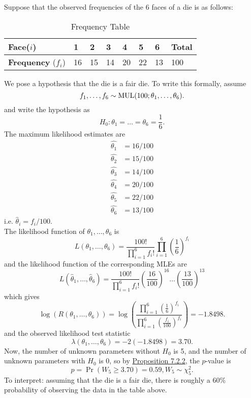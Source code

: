 \documentclass[11pt,fleqn]{book} %
\begin{document}
\begin{example} \label{eg:725}
Suppose that the observed frequencies of the 6 faces of a die is as follows:
\begin{table}[h]
\centering
\begin{tabular}{l l l l l l l l}
\toprule
\textbf{Face}(\(i\)) & 1 & 2 & 3 & 4 & 5 & 6 & \textbf{Total} \\
\midrule
\textbf{Frequency} (\(f_i\)) & 16 & 15 & 14 & 20 & 22 & 13 & 100 \\
\bottomrule
\end{tabular}
\caption{Frequency Table}
\end{table}
\indent We pose a hypothesis that the die is a fair die. To write this formally, assume
\[
f_1, \ldots, f_6 \sim \operatorname{MUL}(100; \theta_1, \ldots, \theta_6).
\]
and write the hypothesis as
\[
H_0: \theta_1 = \dots = \theta_6 = \frac16.
\]
\indent The maximum likelihood estimates are
\[
\begin{aligned}
\hat{\theta_1} &= 16/100 \\
\hat{\theta_2} &= 15/100 \\
\hat{\theta_3} &= 14/100 \\
\hat{\theta_4} &= 20/100 \\
\hat{\theta_5} &= 22/100 \\
\hat{\theta_6} &= 13/100
\end{aligned}
\]
i.e. \(\hat{\theta}_i = f_i / 100\). \\
\indent The likelihood function of \(\theta_1, \ldots, \theta_6\) is
\[
L(\theta_1, \ldots, \theta_6) = \frac{100!}{\prod_{i=1}^6 f_i!} \prod_{i=1}^6\left(\frac16\right)^{f_i}
\]
and the likelihood function of the corresponding MLEs are
\[
L(\hat{\theta}_1, \ldots, \hat{\theta}_6) = \frac{100!}{\prod_{i=1}^6 f_i!} \left(\frac{16}{100}\right)^16 \ldots \left(\frac{13}{100}\right)^{13}
\]
which gives
\[
\log(R(\theta_1, \ldots, \theta_6)) = \log\left(\frac{\prod_{i=1}^6 \left(\frac16\right)^{f_i}}{\prod_{i=1}^6\left(\frac{f_i}{100}\right)^{f_i}}\right) = -1.8498.
\]
and the observed likelihood test statistic
\[
\lambda(\theta_1, \ldots, \theta_6) = -2(-1.8498) = 3.70.
\]
\indent Now, the number of unknown parameters without \(H_0\) is 5, and the number of unknown parameters with \(H_0\) is 0, so by \hyperref[prop:722]{Proposition 7.2.2}, the \(p\)-value is
\[
p = \Pr(W_5 \geq 3.70) = 0.59, W_5 \sim \chi^2_5.
\]
\indent To interpret: assuming that the die is a fair die, there is roughly a 60\% probability of observing the data in the table above.
\end{example}
\end{document}
